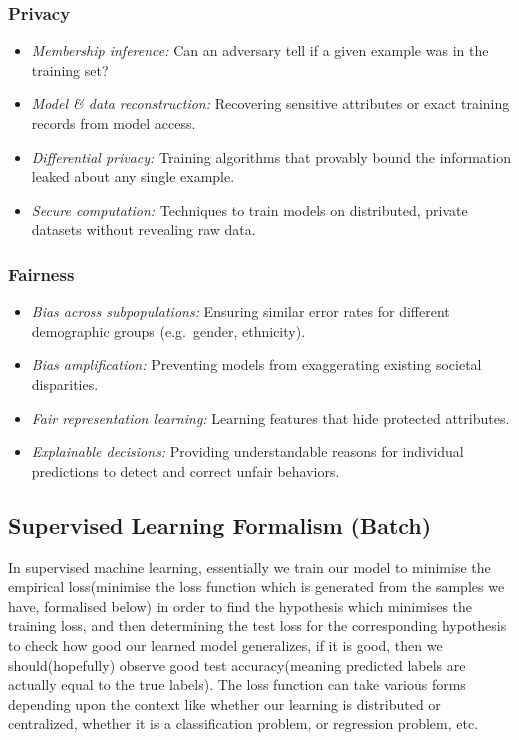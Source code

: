 \documentclass[11pt]{article}
\theoremstyle{plain} %
\begin{document}
\subsubsection*{Privacy}
\begin{itemize}
  \item \emph{Membership inference:} Can an adversary tell if a given example was in the training set?
  \item \emph{Model \& data reconstruction:} Recovering sensitive attributes or exact training records from model access.
  \item \emph{Differential privacy:} Training algorithms that provably bound the information leaked about any single example.
  \item \emph{Secure computation:} Techniques to train models on distributed, private datasets without revealing raw data.
\end{itemize}

\subsubsection*{Fairness}
\begin{itemize}
  \item \emph{Bias across subpopulations:} Ensuring similar error rates for different demographic groups (e.g.\ gender, ethnicity).
  \item \emph{Bias amplification:} Preventing models from exaggerating existing societal disparities.
  \item \emph{Fair representation learning:} Learning features that hide protected attributes.
  \item \emph{Explainable decisions:} Providing understandable reasons for individual predictions to detect and correct unfair behaviors.
\end{itemize}


\subsection{Supervised Learning Formalism (Batch)}
In supervised machine learning, essentially we train our model to minimise the empirical loss(minimise the loss function which is generated from the samples we have, formalised below) in order to find the hypothesis which minimises the training loss, and then determining the test loss for the corresponding hypothesis to check how good our learned model generalizes, if it is good, then we should(hopefully) observe good test accuracy(meaning predicted labels are actually equal to the true labels).
The loss function can take various forms depending upon the context like whether our learning is distributed or centralized, whether it is a classification problem, or regression problem, etc.
\end{document}
